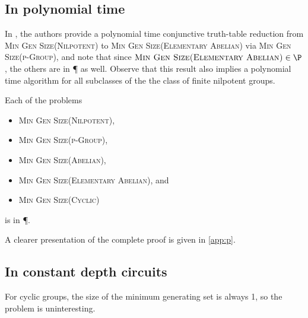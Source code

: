 \documentclass{article}
\begin{document}

\subsection{In polynomial time}

In \cite{at06}, the authors provide a polynomial time conjunctive truth-table reduction from \textsc{Min Gen Size(Nilpotent)} to \textsc{Min Gen Size(Elementary Abelian)} via \textsc{Min Gen Size(p-Group)}, and note that since $\textsc{Min Gen Size(Elementary Abelian)} \in \P$, the others are in \P{} as well.
Observe that this result also implies a polynomial time algorithm for all subclasses of the the class of finite nilpotent groups.

\begin{theorem}[{\cite[Theorem~7]{at06}}]
  Each of the problems
  \begin{itemize}
  \item \textsc{Min Gen Size(Nilpotent)},
  \item \textsc{Min Gen Size(p-Group)},
  \item \textsc{Min Gen Size(Abelian)},
  \item \textsc{Min Gen Size(Elementary Abelian)}, and
  \item \textsc{Min Gen Size(Cyclic)}
  \end{itemize}
  is in \P.
\end{theorem}

A clearer presentation of the complete proof is given in \autoref{app:p}.

\subsection{In constant depth circuits}

For cyclic groups, the size of the minimum generating set is always 1, so the problem is uninteresting.
\end{document}
